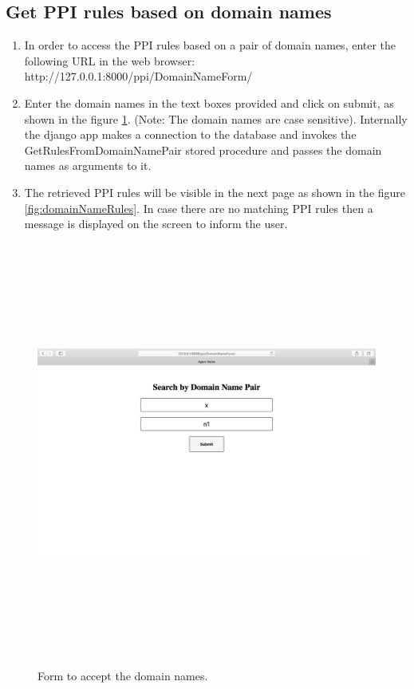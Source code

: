 \documentclass[msc,deptreport,ai]{infthesis}      %
\begin{document}
\subsection {Get PPI rules based on domain names}
\begin{enumerate}
	\item In order to access the PPI rules based on a pair of domain names, enter the following URL in the web browser: http://127.0.0.1:8000/ppi/DomainNameForm/
	\item Enter the domain names in the text boxes provided and click on submit, as shown in the figure \ref{fig:domainNameForm}. (Note: The domain names are case sensitive). Internally the django app makes a connection to the database and invokes the GetRulesFromDomainNamePair stored procedure and passes the domain names as arguments to it.
	\item The retrieved PPI rules will be visible in the next page as shown in the figure \ref{fig:domainNameRules}. In case there are no matching PPI rules then a message is displayed on the screen to inform the user.
\end{enumerate}
	 \begin{figure}[H]
		\centering
		\captionsetup{justification=centering}
		\includegraphics[width=\linewidth,height=14cm,keepaspectratio]{DomainNameForm.png}	
		\caption{Form to accept the domain names.}
		\label{fig:domainNameForm}		
	\end{figure}
\end{document}
